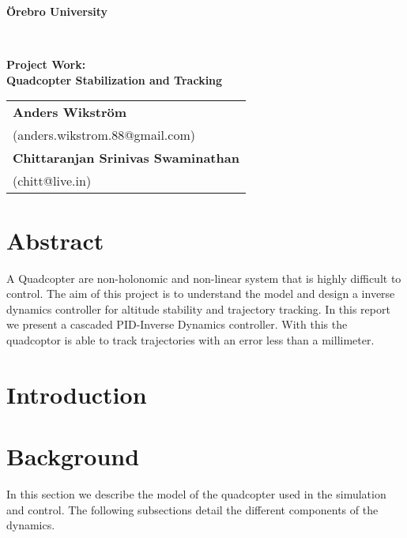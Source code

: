 \documentclass[12pt,fleqn]{article}
\begin{document}
\thispagestyle{empty}
\noindent\makebox[\linewidth]{\rule{.75\paperwidth}{0.4pt}}
\begin{center}
{\Large \textbf{{\"O}rebro University}}
\end{center}
\vspace{-4mm}
\noindent\makebox[\linewidth]{\rule{.75\paperwidth}{0.4pt}} \\
\vspace{4cm}
\begin{center}
{\Large\sffamily\bfseries
Project Work: \\[1ex]
Quadcopter Stabilization and Tracking \\[2ex]
}

\vspace{6cm}
\noindent\makebox[\linewidth]{\rule{.75\paperwidth}{0.4pt}}
{\large
\renewcommand{\arraystretch}{1.5}
  \begin{tabular}{l}
   \textbf{Anders Wikstr\"{o}m}\\
   (anders.wikstrom.88@gmail.com)\\
   \textbf{Chittaranjan Srinivas Swaminathan}\\
   (chitt@live.in)\\
 \end{tabular}}
\end{center}
\vspace{-2mm}
\noindent\makebox[\linewidth]{\rule{.75\paperwidth}{0.4pt}}
\newpage

\tableofcontents

\newpage



\section*{Abstract}
A Quadcopter are non-holonomic and non-linear system that is highly
difficult to control. The aim of this project is to understand the
model and design a inverse dynamics controller for altitude stability
and trajectory tracking. In this report we present a cascaded
PID-Inverse Dynamics controller. With this the quadcoptor is able to
track trajectories with an error less than a millimeter.

\section{Introduction}

\section{Background}
In this section we describe the model of the quadcopter used in the
simulation and control. The following subsections detail the different
components of the dynamics.
\end{document}
